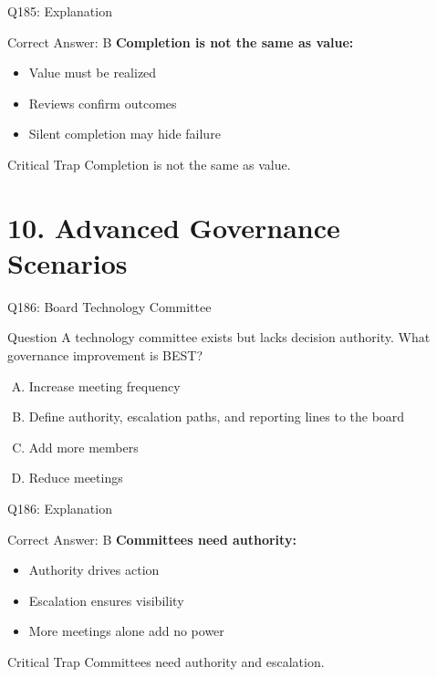 \documentclass{beamer}
\begin{document}
	\begin{frame}{Q185: Explanation}
		\begin{block}{Correct Answer: B}
			\textbf{Completion is not the same as value:}
			\begin{itemize}
				\item Value must be realized
				\item Reviews confirm outcomes
				\item Silent completion may hide failure
			\end{itemize}
		\end{block}
		\begin{alertblock}{Critical Trap}
			Completion is not the same as value.
		\end{alertblock}
	\end{frame}
	
	\section{10. Advanced Governance Scenarios}
	
	\begin{frame}{Q186: Board Technology Committee}
		\begin{block}{Question}
			A technology committee exists but lacks decision authority. What governance improvement is BEST?
		\end{block}
		\begin{enumerate}[(A)]
			\item Increase meeting frequency
			\item Define authority, escalation paths, and reporting lines to the board
			\item Add more members
			\item Reduce meetings
		\end{enumerate}
	\end{frame}
	
	\begin{frame}{Q186: Explanation}
		\begin{block}{Correct Answer: B}
			\textbf{Committees need authority:}
			\begin{itemize}
				\item Authority drives action
				\item Escalation ensures visibility
				\item More meetings alone add no power
			\end{itemize}
		\end{block}
		\begin{alertblock}{Critical Trap}
			Committees need authority and escalation.
		\end{alertblock}
	\end{frame}
	
\end{document}
